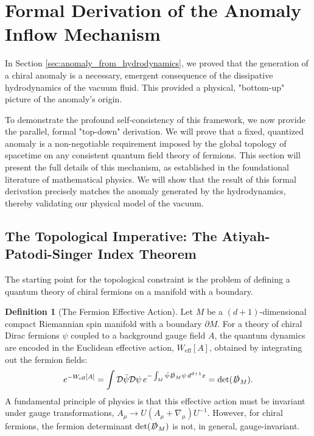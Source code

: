 \documentclass[11pt, letterpaper]{report}
\theoremstyle{plain} %
\theoremstyle{definition} %
\newtheorem{definition}{Definition}[chapter]
\theoremstyle{remark} %
\newcommand{\BulkM}{M}
\newcommand{\BoundaryM}{\partial\BulkM}
\newcommand{\DiracOpBulk}{\slashed{D}_{\BulkM}}
\begin{document}
\section{Formal Derivation of the Anomaly Inflow Mechanism}
\label{sec:formal_anomaly_derivation}

In Section \ref{sec:anomaly_from_hydrodynamics}, we proved that the generation of a chiral anomaly is a necessary, emergent consequence of the dissipative hydrodynamics of the vacuum fluid. This provided a physical, "bottom-up" picture of the anomaly's origin.

To demonstrate the profound self-consistency of this framework, we now provide the parallel, formal "top-down" derivation. We will prove that a fixed, quantized anomaly is a non-negotiable requirement imposed by the global topology of spacetime on any consistent quantum field theory of fermions. This section will present the full details of this mechanism, as established in the foundational literature of mathematical physics. We will show that the result of this formal derivation precisely matches the anomaly generated by the hydrodynamics, thereby validating our physical model of the vacuum.

\subsection{The Topological Imperative: The Atiyah-Patodi-Singer Index Theorem}
\label{subsec:aps_theorem_formal}

The starting point for the topological constraint is the problem of defining a quantum theory of chiral fermions on a manifold with a boundary.

\begin{definition}[The Fermion Effective Action]
Let $\BulkM$ be a $(d+1)$-dimensional compact Riemannian spin manifold with a boundary $\BoundaryM$. For a theory of chiral Dirac fermions $\psi$ coupled to a background gauge field $A$, the quantum dynamics are encoded in the Euclidean effective action, $W_{\text{eff}}[A]$, obtained by integrating out the fermion fields:
\begin{equation}
    e^{-W_{\text{eff}}[A]} = \int \mathcal{D}\bar{\psi}\mathcal{D}\psi \, e^{-\int_{\BulkM} \bar{\psi} \DiracOpBulk \psi \, d^{d+1}x} = \det(\DiracOpBulk).
\end{equation}
A fundamental principle of physics is that this effective action must be invariant under gauge transformations, $A_\mu \to U(A_\mu + \nabla_\mu)U^{-1}$. However, for chiral fermions, the fermion determinant $\det(\DiracOpBulk)$ is not, in general, gauge-invariant.
\end{definition}
\end{document}
